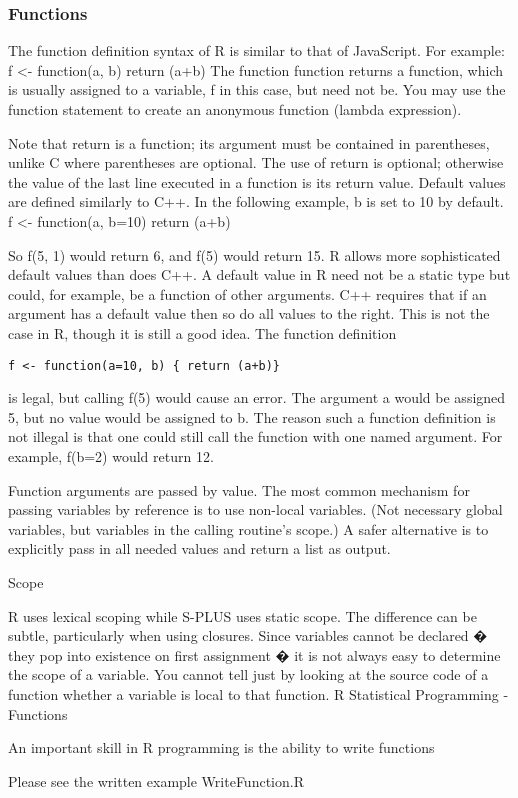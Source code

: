
\newpage
\frametitle{Functions}

The function definition syntax of R is similar to that of JavaScript. For example:
f <- function(a, b) { return (a+b)}
The function function returns a function, which is usually assigned to a variable, f in this case, but need not be. You may use the function statement to create an anonymous function (lambda expression).

Note that return is a function; its argument must be contained in parentheses, unlike C where parentheses are optional. The use of return is optional; otherwise the value of the last line executed in a function is its return value.
Default values are defined similarly to C++. In the following example, b is set to 10 by default.
f <- function(a, b=10) { return (a+b)}

So f(5, 1) would return 6, and f(5) would return 15. R allows more sophisticated default values than does C++. A default value in R need not be a static type but could, for example, be a function of other arguments.
C++ requires that if an argument has a default value then so do all values to the right. This is not the case in R, though it is still a good idea. The function definition

\begin{framed}
\begin{verbatim}
f <- function(a=10, b) { return (a+b)}
\end{verbatim}
\end{framed}

is legal, but calling f(5) would cause an error. The argument a would be assigned 5, but no value would be assigned to b. The reason such a function definition is not illegal is that one could still call the function with one named argument. For example, f(b=2) would return 12.

Function arguments are passed by value. The most common mechanism for passing variables by reference is to use non-local variables. (Not necessary global variables, but variables in the calling routine's scope.) A safer alternative is to explicitly pass in all needed values and return a list as output.

Scope

R uses lexical scoping while S-PLUS uses static scope. The difference can be subtle, particularly when using closures.
Since variables cannot be declared � they pop into existence on first assignment � it is not always easy to determine the scope of a variable. You cannot tell just by looking at the source code of a function whether a variable is local to that function.
R Statistical Programming - Functions

An important skill in R programming is the ability to write functions

Please see the written example WriteFunction.R

